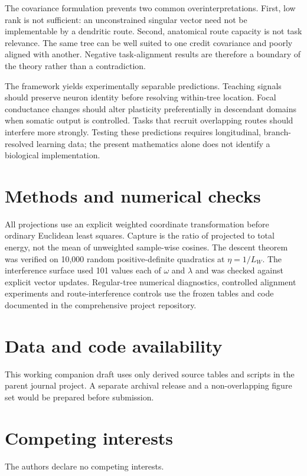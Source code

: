 \documentclass[11pt]{article}
\begin{document}
The covariance formulation prevents two common overinterpretations. First,
low rank is not sufficient: an unconstrained singular vector need not be
implementable by a dendritic route. Second, anatomical route capacity is not
task relevance. The same tree can be well suited to one credit covariance and
poorly aligned with another. Negative task-alignment results are therefore a
boundary of the theory rather than a contradiction.

The framework yields experimentally separable predictions. Teaching signals
should preserve neuron identity before resolving within-tree location. Focal
conductance changes should alter plasticity preferentially in descendant
domains when somatic output is controlled. Tasks that recruit overlapping
routes should interfere more strongly. Testing these predictions requires
longitudinal, branch-resolved learning data;
the present mathematics alone does not identify a biological implementation.

\section{Methods and numerical checks}

All projections use an explicit weighted coordinate transformation before
ordinary Euclidean least squares. Capture is the ratio of projected to total
energy, not the mean of unweighted sample-wise cosines. The descent theorem was
verified on 10,000 random positive-definite quadratics at $\eta=1/L_W$. The
interference surface used 101 values each of $\omega$ and $\lambda$ and was
checked against explicit vector updates. Regular-tree numerical diagnostics,
controlled alignment experiments and route-interference controls use the
frozen tables and code documented in the comprehensive project repository.

\section*{Data and code availability}

This working companion draft uses only derived source tables and scripts in the
parent journal project. A separate archival release and a non-overlapping
figure set would be prepared before submission.

\section*{Competing interests}

The authors declare no competing interests.



\end{document}
